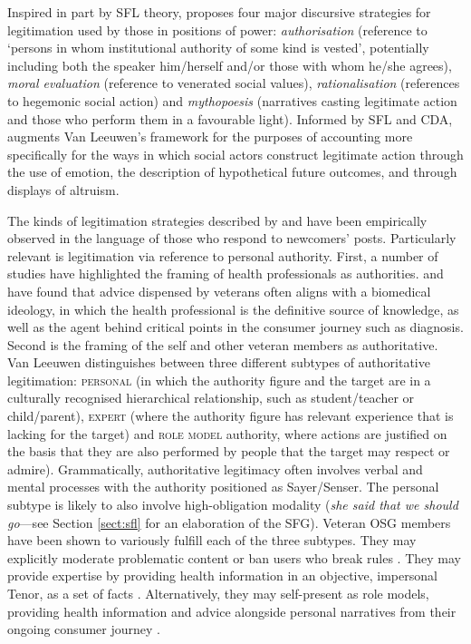 \documentclass{article}
\renewcommand{\cite}{\parencite}
\begin{document}
Inspired in part by SFL theory, \textcite[p.~92]{van_leeuwen_legitimation_2007} proposes four major discursive strategies for legitimation used by those in positions of power: \emph{authorisation} (reference to `persons in whom institutional authority of some kind is vested', potentially including both the speaker him\slash herself and\slash or those with whom he\slash she agrees), \emph{moral evaluation} (reference to venerated social values), \emph{rationalisation} (references to hegemonic social action) and \emph{mythopoesis} (narratives casting legitimate action and those who perform them in a favourable light). Informed by SFL and CDA, \textcite{reyes_strategies_2011} augments Van Leeuwen's framework for the purposes of accounting more specifically for the ways in which social actors construct legitimate action through the use of emotion, the description of hypothetical future outcomes, and through displays of altruism. %


The kinds of legitimation strategies described by \textcite{van_leeuwen_legitimation_2007} and \textcite{reyes_strategies_2011} have been empirically observed in the language of those who respond to newcomers' posts. Particularly relevant is legitimation via reference to personal authority. First, a number of studies have highlighted the framing of health professionals as authorities. \textcite{smithson_problem_2011} and \textcite{vayreda_social_2009} have found that advice dispensed by veterans often aligns with a biomedical ideology, in which the health professional is the definitive source of knowledge, as well as the agent behind critical points in the consumer journey such as diagnosis. Second is the framing of the self and other veteran members as authoritative. Van Leeuwen distinguishes between three different subtypes of authoritative legitimation: \textsc{personal} (in which the authority figure and the target are in a culturally recognised hierarchical relationship, such as student\slash teacher or child\slash parent), \textsc{expert} (where the authority figure has relevant experience that is lacking for the target) and \textsc{role model} authority, where actions are justified on the basis that they are also performed by people that the target may respect or admire). Grammatically, authoritative legitimacy often involves verbal and mental processes with the authority positioned as Sayer\slash Senser. The personal subtype is likely to also involve high-obligation modality (\emph{she said that we should go}---see Section \ref{sect:sfl} for an elaboration of the SFG). Veteran OSG members have been shown to variously fulfill each of the three subtypes. They may explicitly moderate problematic content or ban users who break rules \cite{weber_missed_2011}. They may provide expertise by providing health information in an objective, impersonal Tenor, as a set of facts \cite{kaufman2016producing}. Alternatively, they may self-present as role models, providing health information and advice alongside personal narratives from their ongoing consumer journey \cite{koteyko2015performing}.
\end{document}
